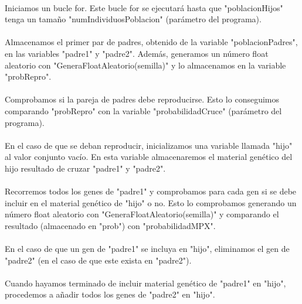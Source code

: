 	\paragraph{}Iniciamos un bucle for. Este bucle for se ejecutará hasta que "poblacionHijos" tenga un tamaño "numIndividuosPoblacion" (parámetro del programa).
	
	\paragraph{}Almacenamos el primer par de padres, obtenido de la variable "poblacionPadres", en las variables "padre1" y "padre2". Además, generamos un número float aleatorio con "GeneraFloatAleatorio(semilla)" y lo almacenamos en la variable "probRepro".
	
	\paragraph{}Comprobamos si la pareja de padres debe reproducirse. Esto lo conseguimos comparando "probRepro" con la variable "probabilidadCruce" (parámetro del programa).
	
	\paragraph{}En el caso de que se deban reproducir, inicializamos una variable llamada "hijo" al valor conjunto vacío. En esta variable almacenaremos el material genético del hijo resultado de cruzar "padre1" y "padre2".
	
	\paragraph{}Recorremos todos los genes de "padre1" y comprobamos para cada gen si se debe incluir en el material genético de "hijo" o no. Esto lo comprobamos generando un número float aleatorio con "GeneraFloatAleatorio(semilla)" y comparando el resultado (almacenado en "prob") con "probabilidadMPX".
	
	\paragraph{}En el caso de que un gen de "padre1" se incluya en "hijo", eliminamos el gen de "padre2" (en el caso de que este exista en "padre2").
	
	\paragraph{}Cuando hayamos terminado de incluir material genético de "padre1" en "hijo", procedemos a añadir todos los genes de "padre2" en "hijo".
	
